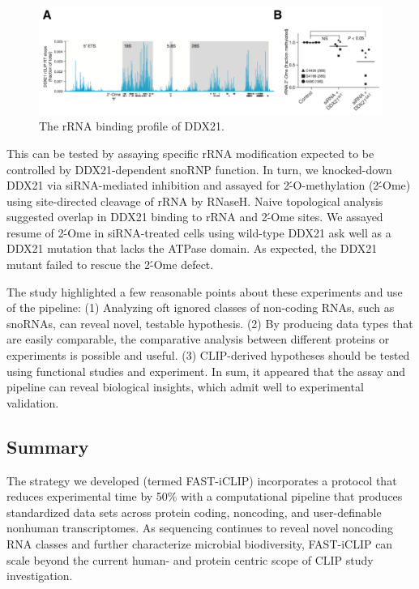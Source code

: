 \begin{figure}
\center\includegraphics[width=150mm,scale=0.5]{Figures/Fig18}
\caption{The rRNA binding profile of DDX21.}
\label{fig:Fig18}
\end{figure}

This can be tested by assaying specific rRNA modification expected to be controlled by DDX21-dependent snoRNP function. In turn, we knocked-down DDX21 via siRNA-mediated inhibition and assayed for 2\'-O-methylation (2\'-Ome) using site-directed cleavage of rRNA by RNaseH. Naive topological analysis suggested overlap in DDX21 binding to rRNA and 2\'-Ome sites. We assayed resume of 2\'-Ome in siRNA-treated cells using wild-type DDX21 ask well as a DDX21 mutation that lacks the ATPase domain. As expected, the DDX21 mutant failed to rescue the 2\'-Ome defect. 

The study highlighted a few reasonable points about these experiments and use of the pipeline: (1) Analyzing oft ignored classes of non-coding RNAs, such as snoRNAs, can reveal novel, testable hypothesis. (2) By producing data types that are easily comparable, the comparative analysis between different proteins or experiments is possible and useful. (3) CLIP-derived hypotheses should be tested using functional studies and experiment. In sum, it appeared that the assay and pipeline can reveal biological insights, which admit well to experimental validation.

\subsection{Summary}

The strategy we developed (termed FAST-iCLIP) incorporates a protocol that reduces experimental time by 50\% with a computational pipeline that produces standardized data sets across protein coding, noncoding, and user-definable nonhuman transcriptomes. As sequencing continues to reveal novel noncoding RNA classes and further characterize microbial biodiversity, FAST-iCLIP can scale beyond the current human- and protein centric scope of CLIP study investigation.
